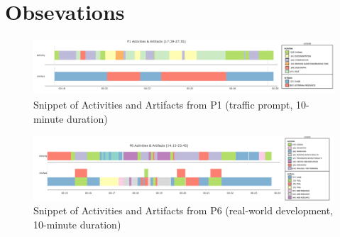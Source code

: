 
\section{Obsevations}

\begin{figure}
\includegraphics[width=\textwidth]{figures/P1timeplot}
\caption{Snippet of Activities and Artifacts from P1 (traffic prompt, 10-minute duration)}
\end{figure}

\begin{figure}
\includegraphics[width=\textwidth]{figures/P6timeplot}
\caption{Snippet of Activities and Artifacts from P6 (real-world development, 10-minute duration)}
\end{figure}

